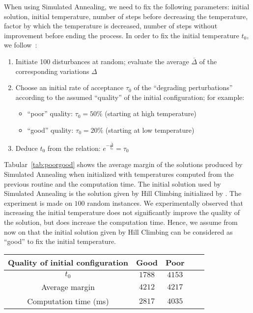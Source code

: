  When using Simulated Annealing, we need to fix the following parameters: initial solution, initial temperature, number of steps before decreasing the temperature, factor by which the temperature is decreased, number of steps without improvement before ending the process. In order to fix the initial temperature $t_0$, we follow~\cite{osman1997meta}:
 \begin{enumerate}
  \item Initiate 100 disturbances at random; evaluate the average $\bar{\Delta}$ of the corresponding variations $\Delta$
\item Choose an initial rate of acceptance $\tau_0$ of the “degrading perturbations” according to the assumed “quality” of the initial configuration; for example:
\begin{itemize}
 \item “poor” quality: $\tau_0 = 50 \%$ (starting at high temperature)
\item “good” quality: $\tau_0 = 20 \%$ (starting at low temperature)
\end{itemize}
\item Deduce $t_0$ from the relation: $e^{-\frac{\bar{\Delta}}{t_0}} = \tau_0$ 
 \end{enumerate}
 
 Tabular~\ref{tab:poorgood} shows the average margin of the solutions produced by Simulated Annealing when initialized with temperatures computed from the previous routine and the computation time. The initial solution used by Simulated Annealing is the solution given by Hill Climbing initialized by \hybridgreedynormalized. The experiment is made on $100$ random instances.
  We experimentally observed that increasing the initial temperature does not significantly improve the quality of the solution, but does increase the computation time. Hence, we assume from now on that the initial solution given by Hill Climbing can be considered as ``good'' to fix the initial temperature.

\begin{center}
\begin{tabular}{ |c|c|c|c|c| }
\hline
 Quality of initial configuration & Good& Poor\\
    \hline
    $t_0$ & $1788$& $4153$\\
    \hline
    Average margin & $4212$ & $4217$ \\
        \hline
    Computation time (ms) &  $2817$&$4035$ \\
    \hline
    
 \end{tabular}
     \label{tab:poorgood}
 \end{center}

